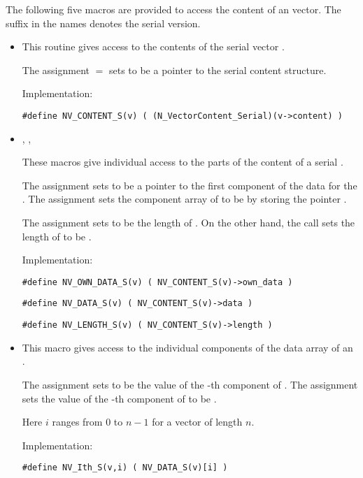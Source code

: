 The following five macros are provided to access the content of an {\nvecs}
vector. The suffix  in the names denotes the serial version.
\begin{itemize}

\item {}                             
    
  This routine gives access to the contents of the serial
  vector .
  
  The assignment  $=$  sets           
   to be a pointer to the serial  content  
  structure.                                             
                                                            
  Implementation: 
  
  \verb|#define NV_CONTENT_S(v) ( (N_VectorContent_Serial)(v->content) )|
  
\item {}, , 


  These macros give individual access to the parts of    
  the content of a serial .                        
                                                               
  The assignment  sets  to be     
  a pointer to the first component of the data for the  . 
  The assignment  sets the component array of  to     
  be  by storing the pointer .                   
  
  The assignment  sets  to be     
  the length of . On the other hand, the call  
  sets the length of  to be .
                                                            
  Implementation: 
  
  \verb|#define NV_OWN_DATA_S(v) ( NV_CONTENT_S(v)->own_data )|

  \verb|#define NV_DATA_S(v) ( NV_CONTENT_S(v)->data )|
  
  \verb|#define NV_LENGTH_S(v) ( NV_CONTENT_S(v)->length )|

\item {}                                               
                                                            
  This macro gives access to the individual components of the data
  array of an .

  The assignment  sets  to be the value of 
  the -th component of . The assignment    
  sets the value of the -th component of  to be .        
  
  Here $i$ ranges from $0$ to $n-1$ for a vector of length $n$.

  Implementation:

  \verb|#define NV_Ith_S(v,i) ( NV_DATA_S(v)[i] )|

\end{itemize}
